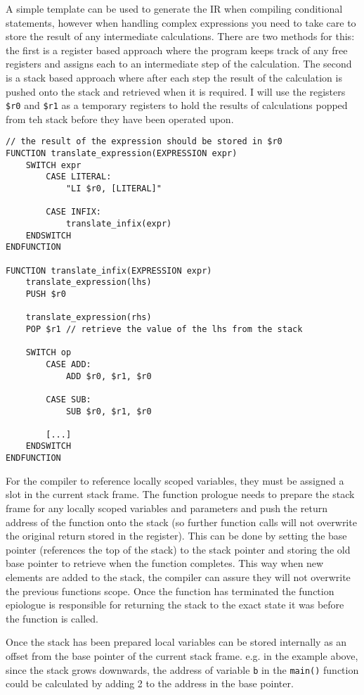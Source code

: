 A simple template can be used to generate the IR when compiling conditional statements, however when handling complex expressions you need to take care to store the result of any intermediate calculations. There are two methods for this: the first is a register based approach where the program keeps track of any free registers and assigns each to an intermediate step of the calculation. The second is a stack based approach where after each step the result of the calculation is pushed onto the stack and retrieved when it is required. I will use the registers \texttt{\$r0} and \texttt{\$r1} as a temporary registers to hold the results of calculations popped from teh stack before they have been operated upon.

\begin{lstlisting}
// the result of the expression should be stored in $r0
FUNCTION translate_expression(EXPRESSION expr) 
    SWITCH expr 
        CASE LITERAL:
            "LI $r0, [LITERAL]"

        CASE INFIX:
            translate_infix(expr)
    ENDSWITCH
ENDFUNCTION

FUNCTION translate_infix(EXPRESSION expr) 
    translate_expression(lhs)
    PUSH $r0

    translate_expression(rhs)
    POP $r1 // retrieve the value of the lhs from the stack

    SWITCH op 
        CASE ADD:
            ADD $r0, $r1, $r0

        CASE SUB:
            SUB $r0, $r1, $r0 

        [...]
    ENDSWITCH
ENDFUNCTION
\end{lstlisting}

For the compiler to reference locally scoped variables, they must be assigned a slot in the current stack frame. The function prologue needs to prepare the stack frame for any locally scoped variables and parameters and push the return address of the function onto the stack (so further function calls will not overwrite the original return stored in the register). This can be done by setting the base pointer (references the top of the stack) to the stack pointer and storing the old base pointer to retrieve when the function completes. This way when new elements are added to the stack, the compiler can assure they will not overwrite the previous functions scope. Once the function has terminated the function epiologue is responsible for returning the stack to the exact state it was before the function is called.

\begin{center}
\end{center}

Once the stack has been prepared local variables can be stored internally as an offset from the base pointer of the current stack frame. e.g. in the example above, since the stack grows downwards, the address of variable \texttt{b} in the \texttt{main()} function could be calculated by adding 2 to the address in the base pointer.